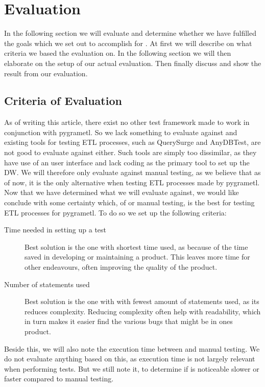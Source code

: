 \section{Evaluation}\label{sect:eval}
In the following section we will evaluate and determine whether we have fulfilled the goals which we set out to accomplish for \FW{}. At first we will describe on what criteria we based the evaluation on. In the following section we will then elaborate on the setup of our actual evaluation. Then finally discuss and show the result from our evaluation.

\subsection{Criteria of Evaluation}\label{subsect:CoE}
As of writing this article, there exist no other test framework made to work in conjunction with pygrametl. So we lack something to evaluate against and existing tools for testing ETL processes, such as QuerySurge and AnyDBTest, are not good to evaluate against either. Such tools are simply too dissimilar, as they have use of an user interface and lack coding as the primary tool to set up the DW. We will therefore only evaluate \FW{} against manual testing, as we believe that as of now, it is the only alternative when testing ETL processes made by pygrametl. Now that we have determined what we will evaluate \FW{} against, we would like conclude with some certainty which, of \FW{} or manual testing, is the best for testing ETL processes for pygrametl. To do so we set up the following criteria:

\begin{description}
\item[Time needed in setting up a test] Best solution is the one with shortest time used, as because of the time saved in developing or maintaining a product. This leaves more time for other endeavours, often improving the quality of the product.
\item[Number of statements used] Best solution is the one with with fewest amount of statements used, as its reduces complexity. Reducing complexity often help with readability, which in turn makes it easier find the various bugs that might be in ones product.
\end{description}
Beside this, we will also note the execution time between \FW{} and manual testing. We do not evaluate anything based on this, as execution time is not largely relevant when performing tests. But we still note it, to determine if \FW{} is noticeable slower or faster compared to manual testing.

